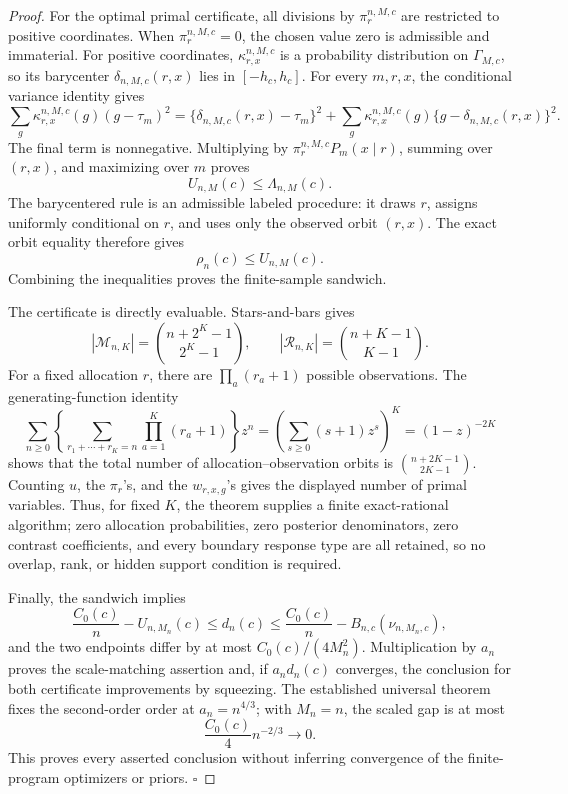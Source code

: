 \documentclass{article}
\begin{document}
\begin{proof}
For the optimal primal certificate, all divisions by \(\pi_r^{n,M,c}\) are restricted to positive coordinates.  When \(\pi_r^{n,M,c}=0\), the chosen value zero is admissible and immaterial.  For positive coordinates, \(\kappa_{r,x}^{n,M,c}\) is a probability distribution on \(\Gamma_{M,c}\), so its barycenter \(\delta_{n,M,c}(r,x)\) lies in \([-h_c,h_c]\).  For every \(m,r,x\), the conditional variance identity gives
\[
 \sum_g\kappa_{r,x}^{n,M,c}(g)(g-\tau_m)^2
 =\{\delta_{n,M,c}(r,x)-\tau_m\}^2
 +\sum_g\kappa_{r,x}^{n,M,c}(g)
 \{g-\delta_{n,M,c}(r,x)\}^2.
\]
The final term is nonnegative.  Multiplying by \(\pi_r^{n,M,c}P_m(x\mid r)\), summing over \((r,x)\), and maximizing over \(m\) proves
\[
 U_{n,M}(c)\leq\Lambda_{n,M}(c).
\]
The barycentered rule is an admissible labeled procedure: it draws \(r\), assigns uniformly conditional on \(r\), and uses only the observed orbit \((r,x)\).  The exact orbit equality therefore gives
\[
 \rho_n(c)\leq U_{n,M}(c).
\]
Combining the inequalities proves the finite-sample sandwich.

The certificate is directly evaluable.  Stars-and-bars gives
\[
 |\mathcal M_{n,K}|=\binom{n+2^K-1}{2^K-1},
 \qquad
 |\mathcal R_{n,K}|=\binom{n+K-1}{K-1}.
\]
For a fixed allocation \(r\), there are \(\prod_a(r_a+1)\) possible observations.  The generating-function identity
\[
 \sum_{n\geq0}\left\{
 \sum_{r_1+\cdots+r_K=n}\prod_{a=1}^K(r_a+1)
 \right\}z^n
 =\left(\sum_{s\geq0}(s+1)z^s\right)^K
 =(1-z)^{-2K}
\]
shows that the total number of allocation--observation orbits is \(\binom{n+2K-1}{2K-1}\).  Counting \(u\), the \(\pi_r\)'s, and the \(w_{r,x,g}\)'s gives the displayed number of primal variables.  Thus, for fixed \(K\), the theorem supplies a finite exact-rational algorithm; zero allocation probabilities, zero posterior denominators, zero contrast coefficients, and every boundary response type are all retained, so no overlap, rank, or hidden support condition is required.

Finally, the sandwich implies
\[
 \frac{C_0(c)}n-U_{n,M_n}(c)
 \leq d_n(c)
 \leq\frac{C_0(c)}n-B_{n,c}(\nu_{n,M_n,c}),
\]
and the two endpoints differ by at most \(C_0(c)/(4M_n^2)\).  Multiplication by \(a_n\) proves the scale-matching assertion and, if \(a_nd_n(c)\) converges, the conclusion for both certificate improvements by squeezing.  The established universal theorem fixes the second-order order at \(a_n=n^{4/3}\); with \(M_n=n\), the scaled gap is at most
\[
 \frac{C_0(c)}4n^{-2/3}\longrightarrow0.
\]
This proves every asserted conclusion without inferring convergence of the finite-program optimizers or priors. \(\square\)
\end{proof}
\end{document}
